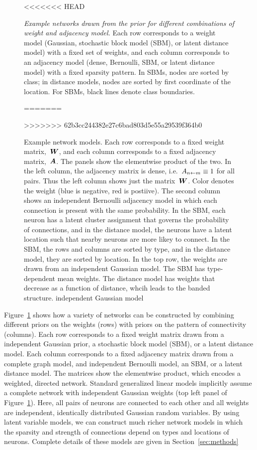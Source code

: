 \begin{figure}[t!]
\begin{subfigure}[b]{1.10in}
  \end{subfigure}
<<<<<<< HEAD
  \\
  \vspace{-.1in}
  \caption{\textit{Example networks drawn from the prior for different combinations of weight and adjacency model.} Each row corresponds to a weight model (Gaussian, stochastic block model (SBM), or latent distance model) with a fixed set of weights, and each column corresponds to an adjacency model (dense, Bernoulli, SBM, or latent distance model) with a fixed sparsity pattern. In SBMs, nodes are sorted by class; in distance models, nodes are sorted by first coordinate of the location. For SBMs, black lines denote class boundaries. }
  \label{fig:networks}
=======
  \caption{Example network models. Each row corresponds to a fixed weight matrix,~$\boldsymbol{W}$, 
    and each column corresponds to a fixed adjacency matrix,~$\boldsymbol{A}$. The panels show 
    the elementwise product of the two. In the left column, the adjacency matrix is 
    dense, i.e.~$A_{n \leftarrow m} \equiv 1$ for all pairs. Thus the left column shows
    just the matrix~$\boldsymbol{W}$. Color denotes the weight (blue is negative, red is postiive).
    The second column shows an independent Bernoulli adjacency 
    model in which each connection is present with the same probability. In the SBM, 
    each neuron has a latent cluster assignment that governs the probability of 
    connections, and in the distance model, the neurons have a latent location such 
    that nearby neurons are more likey to connect. In the SBM, the rows and columns 
    are sorted by type, and in the distance model, they are sorted by location. 
    In the top row, the weights are drawn from an independent Gaussian model. The 
    SBM has type-dependent mean weights. The distance model has weights that 
    decrease as a function of distance, whcih leads to the banded structure.
    independent Gaussian model}
  \label{fig:network_models}
>>>>>>> 62b3cc244382e27c6bad803d5e55a29539f364b0
\end{figure}

Figure~\ref{fig:network_models} shows how a variety of networks can be 
constructed by combining different priors on the weights 
(rows) with priors on the pattern of 
connectivity (columns). Each row corresponds to a fixed weight matrix 
drawn from a independent Gaussian prior, a stochastic block model (SBM), or a latent 
distance model. Each column corresponds to a fixed adjacency matrix 
drawn from a complete graph model, and independent Bernoulli model, 
an SBM, or a latent distance model. The matrices show the elementwise 
product, which encodes a weighted, directed network. Standard generalized linear models implicitly assume a complete network with 
independent Gaussian weights (top left panel of Figure~\ref{fig:network_models}).
Here, all pairs of neurons are connected to each other and all weights are 
independent, identically distributed Gaussian random variables. By using latent variable 
models, we can construct much richer network models in which the sparsity 
and strength of connections depend on types and locations of neurons. 
Complete details of these models are given in Section~\ref{sec:methods}

